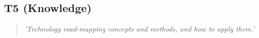 \subsection*{T5 (Knowledge)}

  \begin{quote}
    \textit{'Technology road-mapping concepts and
    methods, and how to apply them.'}
  \end{quote}

\newpage